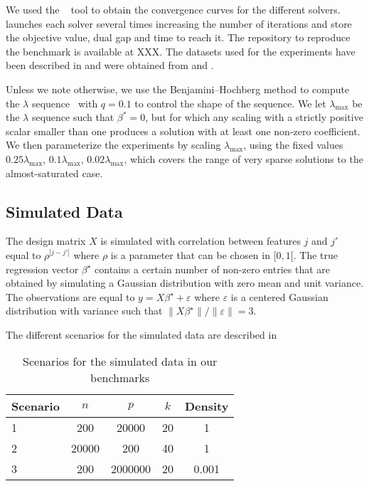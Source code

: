 We used the ~\parencite{moreau2022benchopt} tool to obtain the convergence curves for the different solvers.
 launches each solver several times increasing the number of iterations and store the objective value, dual gap and time to reach it.
The repository to reproduce the benchmark is available at XXX.
The datasets used for the experiments have been described in  and were obtained from \textcite{chang2011,chang2016} and \textcite{breheny2022}.

Unless we note otherwise, we use the Benjamini--Hochberg method to compute the \(\lambda\) sequence~\parencite{bogdan2015} with \(q=0.1\) to control the shape of the sequence.
We let \(\lambda_\text{max}\) be the \(\lambda\) sequence such that \(\beta^* = 0\), but for which any scaling with a strictly positive scalar smaller than one produces a solution with at least one non-zero coefficient.
We then parameterize the experiments by scaling \(\lambda_\text{max}\), using the fixed values \(0.25 \lambda_\text{max}\), \(0.1 \lambda_\text{max}\), \(0.02 \lambda_\text{max}\), which covers the range of very sparse solutions to the almost-saturated case.

\subsection{Simulated Data}
\label{sec:experiments-real-data}

The design matrix $X$ is simulated with correlation between features $j$ and $j'$ equal to $\rho^{|j-j'|}$ where $\rho$ is a parameter that can be chosen in $[0, 1[$.
The true regression vector $\beta^\star$ contains a certain number of non-zero entries that are obtained by simulating a Gaussian distribution with zero mean and unit variance.
The observations are equal to $y=X\beta^\star + \varepsilon$ where $\varepsilon$ is a centered Gaussian distribution with variance such that $\lVert X\beta^\star\rVert / \lVert \varepsilon \rVert = 3$.

The different scenarios for the simulated data are described in 

\begin{table}[hbt]
  \centering
  \caption{Scenarios for the simulated data in our benchmarks}
  \label{tab:simulated-data}
  \begin{tabular}{
      l
      S[table-format=5.0,round-mode=off]
      S[table-format=7.0,round-mode=off]
      S[table-format=2.0,round-mode=off]
      S[table-format=1.3,round-mode=off]
    }
    \toprule
    {Scenario} & \(n\) & \(p\)   & \(k\) & {Density} \\           & 200   & 20000   & 20    & 1         \\
    2          & 20000 & 200     & 40    & 1         \\
    3          & 200   & 2000000 & 20    & 0.001     \\ \bottomrule
  \end{tabular}
\end{table}

